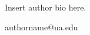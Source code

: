 \documentclass{article}
\theoremstyle{theorem}
\theoremstyle{definition}
\begin{document}
\begin{biog}
\item[Author Name 2] Insert author bio here.
\begin{affil}
authorname@ua.edu
\end{affil}
\end{biog}

\vfill\eject
\end{document}
